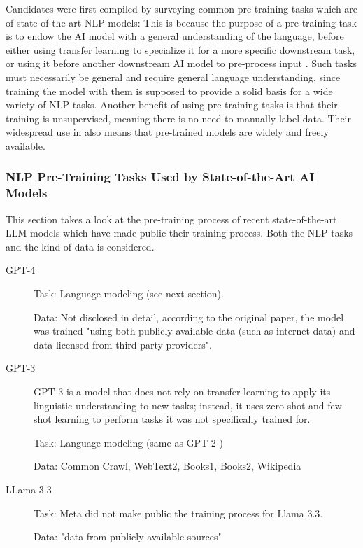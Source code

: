 Candidates were first compiled by surveying common pre-training tasks which are of state-of-the-art NLP models:
This is because the purpose of a pre-training task is to endow the AI model with a general understanding of the language, before either using transfer learning to specialize it for a more specific downstream task, or using it before another downstream AI model to pre-process input .
Such tasks must necessarily be general and require general language understanding, since training the model with them is supposed to provide a solid basis for a wide variety of NLP tasks.
Another benefit of using pre-training tasks is that their training is unsupervised, meaning there is no need to manually label data.
Their widespread use in \NLP also means that pre-trained models are widely and freely available.

\subsubsection{NLP Pre-Training Tasks Used by State-of-the-Art AI Models}
This section takes a look at the pre-training process of recent state-of-the-art LLM models which have made public their training process.
Both the NLP tasks and the kind of data is considered.


\begin{description}
	\item[GPT-4] \cite{openaiGPT4TechnicalReport2024}

	      Task: Language modeling (see next section).

	      Data: Not disclosed in detail, according to the original paper, the model was trained "using both publicly available data (such as internet data) and data licensed from third-party providers".
	\item[GPT-3] \cite{brownLanguageModelsAre2020}
	      GPT-3 is a model that does not rely on transfer learning to apply its linguistic understanding to new tasks; instead, it uses zero-shot and few-shot learning to perform tasks it was not specifically trained for.

	      Task: Language modeling (same as GPT-2 \cite{radfordLanguageModelsAre2019})

	      Data: Common Crawl, WebText2, Books1, Books2, Wikipedia 
	\item[LLama 3.3] \cite{LlamamodelsModelsLlama3_3}


	      Task: Meta did not make public the training process for Llama 3.3.

	      Data: "data from publicly available sources"
\end{description}

